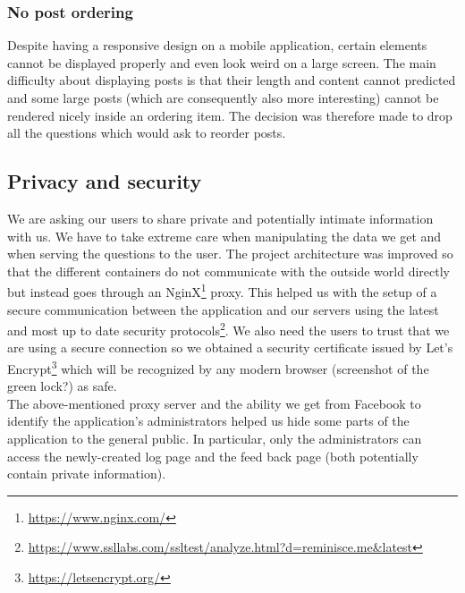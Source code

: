 \subsubsection{No post ordering}
Despite having a responsive design on a mobile application, certain elements cannot be displayed properly and even look weird on a large screen. The main difficulty about displaying posts is that their length and content cannot predicted and some large posts (which are consequently also more interesting) cannot be rendered nicely inside an ordering item. The decision was therefore made to drop all the questions which would ask to reorder posts.
\subsection{Privacy and security}
We are asking our users to share private and potentially intimate information with us. We have to take extreme care when manipulating the data we get and when serving the questions to the user. The project architecture was improved so that the different containers do not communicate with the outside world directly but instead goes through an NginX\footnote{\url{https://www.nginx.com/}} proxy. This helped us with the setup of a secure communication between the application and our servers using the latest and most up to date security protocols\footnote{\url{https://www.ssllabs.com/ssltest/analyze.html?d=reminisce.me&latest}}. We also need the users to trust that we are using a secure connection so we obtained a security certificate issued by Let's Encrypt\footnote{\url{https://letsencrypt.org/}} which will be recognized by any modern browser (screenshot of the green lock?) as safe.\\
The above-mentioned proxy server and the ability we get from Facebook to identify the application's administrators helped us hide some parts of the application to the general public. In particular, only the administrators can access the newly-created log page and the feed back page (both potentially contain private information).